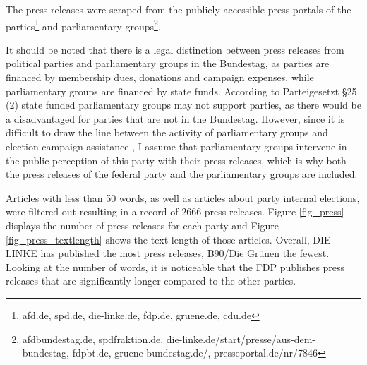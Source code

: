 \documentclass[12pt,a4paper,notitlepage]{article}
\begin{document}
The press releases were scraped from the publicly accessible press portals of the parties\footnote{afd.de, spd.de, die-linke.de, fdp.de, gruene.de, cdu.de} and parliamentary groups\footnote{afdbundestag.de, spdfraktion.de, die-linke.de/start/presse/aus-dem-bundestag, fdpbt.de, gruene-bundestag.de/, presseportal.de/nr/7846}. 

It should be noted that there is a legal distinction between press releases from political parties and parliamentary groups in the Bundestag, as parties are financed by membership dues, donations and campaign expenses, while parliamentary groups are financed by state funds. According to Parteigesetzt §25 (2) state funded parliamentary groups may not support parties, as there would be a disadvantaged for parties that are not in the Bundestag. However, since it is difficult to draw the line between the activity of parliamentary groups and election campaign assistance \citep{kepplinger_einfluss_2004}, I assume that parliamentary groups intervene in the public perception of this party with their press releases, which is why both the press releases of the federal party and the parliamentary groups are included.

Articles with less than 50 words, as well as articles about party internal elections, were filtered out resulting in a record of 2666 press releases. Figure \ref{fig_press} displays the number of press releases for each party and Figure \ref{fig_press_textlength} shows the text length of those articles. Overall, DIE LINKE has published the most press releases, B90/Die Grünen the fewest. Looking at the number of words, it is noticeable that the FDP publishes press releases that are significantly longer compared to the other parties.
\end{document}

